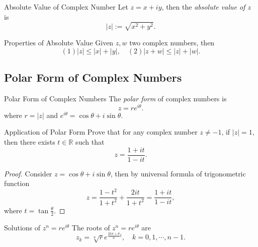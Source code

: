 \begin{definition}{Absolute Value of Complex Number}{}
  Let $z = x + iy$, then the \emph{absolute value of $z$} is
  \begin{equation}
    |z| := \sqrt{x^2 + y^2}.
  \end{equation}
\end{definition}

\begin{proposition}{Properties of Absolute Value}{}
  Given $z, w$ two complex numbers, then
  \begin{equation}
    (1) |z| \leq |x| + |y|, \quad
    (2) |z + w| \leq |z| + |w|.
  \end{equation}
\end{proposition}


\subsection{Polar Form of Complex Numbers}

\begin{definition}{Polar Form of Complex Numbers}{}
  The \emph{polar form} of complex numbers is
  \begin{equation}
    z = r e^{i\theta}.
  \end{equation}
  where $r = |z|$ and $e^{i\theta} = \cos \theta + i \sin \theta$.
\end{definition}

\begin{example}{Application of Polar Form}{}
  Prove that for any complex number $z \neq -1$, if $|z| = 1$,
  then there exists $t \in \mathbb{R}$ such that
  \begin{equation}
    z = \frac{1 + it}{1 - it}.
  \end{equation}
\end{example}

\begin{proof}
  Consider $z = \cos \theta + i \sin \theta$, then by universal formula of
  trigonometric function
  \begin{equation}
    z = \frac{1 - t^2}{1 + t^2} + \frac{2i t}{1 + t^2} = \frac{1+it}{1 - it},
  \end{equation}
  where $t = \tan \frac{\theta}{2}$.
\end{proof}

\begin{proposition}{Solutions of $z^n = re^{i\theta}$}{}
  The roots of $z^n = re^{i\theta}$ are
  \begin{equation}
    z_k = \sqrt[n]{r} e^{\frac{2k\pi + \theta}{n}i}, \quad k = 0,1,\cdots,n-1.
  \end{equation}
\end{proposition}

